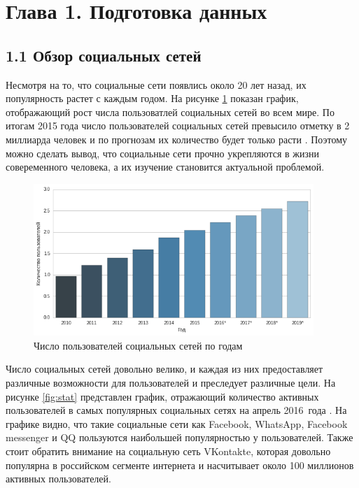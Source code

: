 \documentclass[a4paper]{report}
\begin{document}
	
	
	
	\section{Глава 1. Подготовка данных}
	\subsection{1.1 Обзор социальных сетей}
	
	
	
	Несмотря на то, что социальные сети появлись около 20 лет назад, их популярность растет с каждым годом. На рисунке \ref{fig:popularity}  показан график, отображающий рост числа пользоватлей социальных сетей во всем мире. По итогам 2015 года число пользователей социальных сетей превысило отметку в 2 миллиарда человек и по прогнозам их количество будет только расти \cite{bib:Popularity}. Поэтому можно сделать вывод, что социальные сети прочно укрепляются в жизни совеременного человека, а их изучение становится актуальной проблемой.
	\newline
	\begin{figure}[h]
		
		\centering
		\includegraphics[width=400px]
		{imgs/Popularity.png}
		\caption{Число пользователей социальных сетей по годам}
		\label{fig:popularity}
	\end{figure}
	\newline			
	
	Число социальных сетей довольно велико, и каждая из них предоставляет различные возможности для пользователей и преследует различные цели.  На рисунке \ref{fig:stat} представлен график, отражающий количество активных пользователей в самых популярных социальных сетях на апрель 2016~года  \cite{bib:PopularNetwork}. На графике видно, что такие социальные сети как Facebook, WhatsApp, Facebook messenger и QQ пользуются наибольшей популярностью у пользователей. 	
	Также стоит обратить внимание на социальную сеть VKontakte, которая довольно популярна в российском сегменте интернета и насчитывает около 100 миллионов активных пользователей.
	
\end{document}
